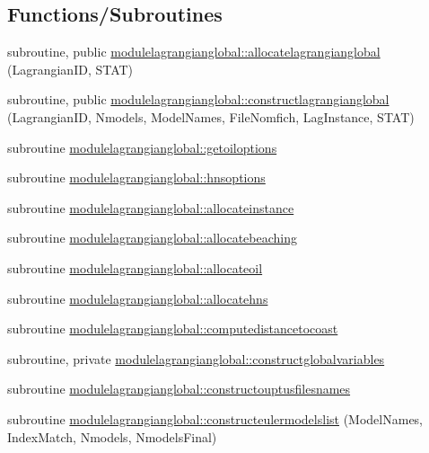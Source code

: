\subsection*{Functions/\+Subroutines}
\begin{DoxyCompactItemize}
\item 
subroutine, public \mbox{\hyperlink{namespacemodulelagrangianglobal_a8ae3b3566ebe3cc057810473a03a4abf}{modulelagrangianglobal\+::allocatelagrangianglobal}} (Lagrangian\+ID, S\+T\+AT)
\item 
subroutine, public \mbox{\hyperlink{namespacemodulelagrangianglobal_a19213baf32d688585211b786d897cd69}{modulelagrangianglobal\+::constructlagrangianglobal}} (Lagrangian\+ID, Nmodels, Model\+Names, File\+Nomfich, Lag\+Instance, S\+T\+AT)
\item 
subroutine \mbox{\hyperlink{namespacemodulelagrangianglobal_a64f08b972c519197b497942c12d54fd5}{modulelagrangianglobal\+::getoiloptions}}
\item 
subroutine \mbox{\hyperlink{namespacemodulelagrangianglobal_a262f7ae29a62989ca338ab8fa6acca79}{modulelagrangianglobal\+::hnsoptions}}
\item 
subroutine \mbox{\hyperlink{namespacemodulelagrangianglobal_abce203684794c35638261e5dc08eae81}{modulelagrangianglobal\+::allocateinstance}}
\item 
subroutine \mbox{\hyperlink{namespacemodulelagrangianglobal_a48e2f7f1b1f2612fb2b891f9ae7918b4}{modulelagrangianglobal\+::allocatebeaching}}
\item 
subroutine \mbox{\hyperlink{namespacemodulelagrangianglobal_a0be041be04e7755f84bc26f6dfe301b0}{modulelagrangianglobal\+::allocateoil}}
\item 
subroutine \mbox{\hyperlink{namespacemodulelagrangianglobal_aa4f2e4611a6f55063b6b425e9af734c9}{modulelagrangianglobal\+::allocatehns}}
\item 
subroutine \mbox{\hyperlink{namespacemodulelagrangianglobal_ae26f6cb369947b236a6e8dffcbed3eb2}{modulelagrangianglobal\+::computedistancetocoast}}
\item 
subroutine, private \mbox{\hyperlink{namespacemodulelagrangianglobal_ac07ce699fa5190e37b220b344450ba80}{modulelagrangianglobal\+::constructglobalvariables}}
\item 
subroutine \mbox{\hyperlink{namespacemodulelagrangianglobal_a083836de958c69614f913a7f1b0bee9e}{modulelagrangianglobal\+::constructouptusfilesnames}}
\item 
subroutine \mbox{\hyperlink{namespacemodulelagrangianglobal_a409542d48e7b2b20840dc3545d1a34f0}{modulelagrangianglobal\+::constructeulermodelslist}} (Model\+Names, Index\+Match, Nmodels, Nmodels\+Final)

\end{DoxyCompactItemize}
